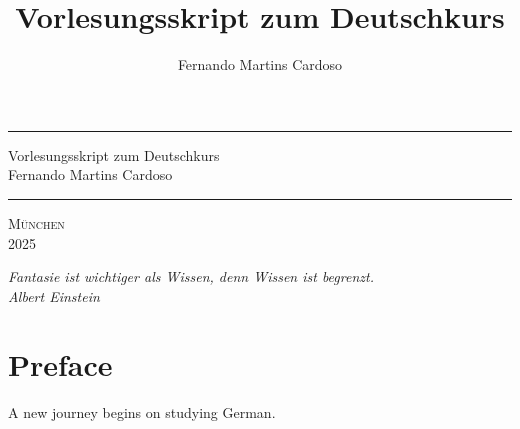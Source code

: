 \documentclass[12pt,a4paper,twoside]{book}
\title{Vorlesungsskript zum Deutschkurs}
\author{Fernando Martins Cardoso}
\begin{document}
\thispagestyle{empty}
\newcommand{\HRule}{\rule{\linewidth}{1mm}}
\setlength{\parindent}{0mm}
\setlength{\parskip}{0mm}
 \HRule
 \begin{flushright}
  \Huge Vorlesungsskript zum Deutschkurs\\[5mm]
        \huge Fernando Martins Cardoso
 \end{flushright}
 \HRule
 \begin{center}
  \Large\textsc{München\\ 2025}
 \end{center}
 
\newpage
\topmargin 7.2in
\thispagestyle{empty}
\begin{flushright}
\textit{Fantasie ist wichtiger als Wissen, denn Wissen ist begrenzt.\\Albert Einstein}
\end{flushright}

\newpage
\hoffset -1in           %
\voffset -1in           %
\marginparwidth 0pt     %
\marginparsep 0pt       %
\parindent 12pt         %
\parskip 4pt            %
\topmargin 1cm          %
\headheight 15pt        %
\headsep 20pt           %
\oddsidemargin 2.5cm      %
\evensidemargin 2cm     %
\footskip 40pt

\chapter*{Preface}
A new journey begins on studying German.
\lipsum[1-10]

\tableofcontents

\newpage
{}

\pagestyle{fancy}                   %
\fancyhf{}                          %
\fancyfoot[LE]{\thepage}             %
\fancyfoot[RO]{\thepage}


%


\end{document}
